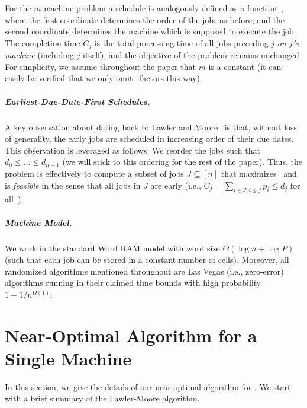 \documentclass[10pt,a4paper]{article}
\newcommand\Order{O}
\newcommand\MTPT{\smash{$1||\sum p_j U_j$}}
\newcommand\mMTPT{\smash{$P_m||\sum p_j U_j$}}
\begin{document}
For the $m$-machine problem \mMTPT{} a schedule is analogously defined as a function~\makebox{$\sigma : [n] \to [n] \times [m]$}, where the first coordinate determines the order of the jobs as before, and the second coordinate determines the machine which is supposed to execute the job. The completion time $C_j$ is the total processing time of all jobs preceding $j$ \emph{on $j$'s machine} (including $j$ itself), and the objective of the problem remains unchanged. For simplicity, we assume throughout the paper that $m$ is a constant (it can easily be verified that we only omit~\smash{$m^{\Order(1)}$}-factors this way).

\subparagraph{Earliest-Due-Date-First Schedules.}
A key observation about \MTPT{} dating back to Lawler and Moore~\cite{LawlerM69} is that, without loss of generality, the early jobs are scheduled in increasing order of their due dates. This observation is leveraged as follows: We reorder the jobs such that $d_0 \leq \dots \leq d_{n-1}$ (we will stick to this ordering for the rest of the paper). Thus, the \MTPT{} problem is effectively to compute a subset of jobs $J \subseteq [n]$ that maximizes~ and is \emph{feasible} in the sense that all jobs in $J$ are early (i.e., $C_j = \sum_{i \in J : i \leq j} p_i \leq d_j$ for all~).

\subparagraph{Machine Model.}
We work in the standard Word RAM model with word size $\Theta(\log n + \log P)$ (such that each job can be stored in a constant number of cells). Moreover, all randomized algorithms mentioned throughout are Las Vegas (i.e., zero-error) algorithms running in their claimed time bounds with high probability $1 - 1/n^{\Omega(1)}$.




\section{Near-Optimal Algorithm for a Single Machine}
\label{sec:algorithm-for-one-machine}

In this section, we give the details of our near-optimal algorithm for \MTPT{}. We start with a brief summary of the Lawler-Moore algorithm. 
\end{document}
